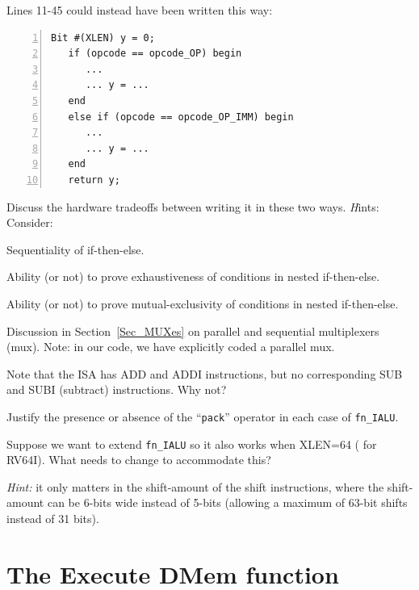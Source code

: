 \hdivider

\Exercise

Lines 11-45 could instead have been written this way:

{\small
\begin{Verbatim}[frame=single, numbers=left]
   Bit #(XLEN) y = 0;
   if (opcode == opcode_OP) begin
      ...
      ... y = ...
   end
   else if (opcode == opcode_OP_IMM) begin
      ...
      ... y = ...
   end
   return y;
\end{Verbatim}
}

Discuss the hardware tradeoffs between writing it in these two ways.
{\emph Hints:} Consider:

\begin{tightlist}

  \item Sequentiality of if-then-else.
  \item Ability (or not) to prove exhaustiveness of conditions in nested if-then-else.
  \item Ability (or not) to prove mutual-exclusivity of conditions in nested if-then-else.
  \item Discussion in Section~\ref{Sec_MUXes} on parallel and
    sequential multiplexers (mux).  Note: in our code, we have
    explicitly coded a parallel mux.

\end{tightlist}

\Exercise

Note that the ISA has ADD and ADDI instructions, but no corresponding
SUB and SUBI (subtract) instructions.  Why not?

\Exercise

Justify the presence or absence of the ``{\tt pack}'' operator in each
case of {\tt fn\_IALU}.

\Exercise

Suppose we want to extend {\tt fn\_IALU} so it also works when XLEN=64
({\ie} for RV64I).  What needs to change to accommodate this?

\emph{Hint:} it only matters in the shift-amount of the shift
instructions, where the shift-amount can be 6-bits wide instead of
5-bits (allowing a maximum of 63-bit shifts instead of 31 bits).

\Endexercise


\section{The Execute DMem function}

